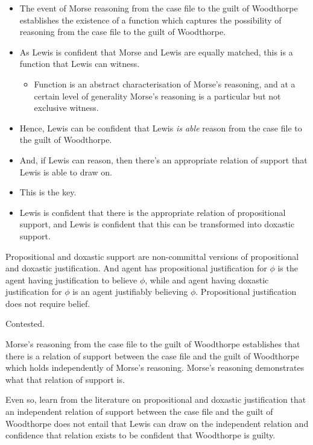 \documentclass[10pt]{article}
\newcommand{\hozlinedash}[0]{%
  \noindent\hdashrule[0.5ex][c]{\textwidth}{.1pt}{2.5pt}
}
\begin{document}
\begin{itemize}
\item The event of Morse reasoning from the case file to the guilt of Woodthorpe establishes the existence of a function which captures the possibility of reasoning from the case file to the guilt of Woodthorpe.
\item As Lewis is confident that Morse and Lewis are equally matched, this is a function that Lewis can witness.
  \begin{itemize}
  \item Function is an abstract characterisation of Morse's reasoning, and at a certain level of generality Morse's reasoning is a particular but not exclusive witness.
  \end{itemize}
\item Hence, Lewis can be confident that Lewis \emph{is able} reason from the case file to the guilt of Woodthorpe.
\item And, if Lewis can reason, then there's an appropriate relation of support that Lewis is able to draw on.
\item This is the key.
\end{itemize}

\hozlinedash

\begin{itemize}
\item Lewis is confident that there is the appropriate relation of propositional support, and Lewis is confident that this can be transformed into doxastic support.
\end{itemize}

Propositional and doxastic support are non-committal versions of propositional and doxastic justification.
And agent has propositional justification for \(\phi\) is the agent having justification to believe \(\phi\), while and agent having doxastic justification for \(\phi\) is an agent justifiably believing \(\phi\).
Propositional justification does not require belief.

Contested.

Morse's reasoning from the case file to the guilt of Woodthorpe establishes that there is a relation of support between the case file and the guilt of Woodthorpe which holds independently of Morse's reasoning.
Morse's reasoning demonstrates what that relation of support is.

Even so, learn from the literature on propositional and doxastic justification that an independent relation of support between the case file and the guilt of Woodthorpe does not entail that Lewis can draw on the independent relation and confidence that relation exists to be confident that Woodthorpe is guilty.
\end{document}
